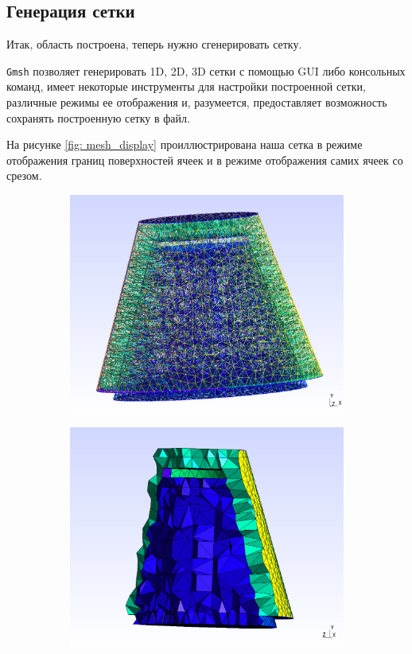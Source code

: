 \documentclass[a4paper, 14pt]{extreport}
\begin{document}
\newpage
\subsection{Генерация сетки}

Итак, область построена, теперь нужно сгенерировать сетку.

\texttt{Gmsh} позволяет генерировать 1D, 2D, 3D сетки с помощью 
GUI либо консольных команд, имеет некоторые инструменты
для настройки построенной сетки, различные режимы ее отображения
и, разумеется, предоставляет возможность сохранять построенную сетку в файл.

На рисунке \ref{fig: mesh_display}
проиллюстрирована наша сетка в режиме отображения границ
поверхностей ячеек и в режиме отображения самих ячеек со срезом.

\begin{figure}[H]
	\begin{subfigure}[h]{0.5\textwidth}
		\includegraphics[scale=0.23]{pictures/mesh_surfaces_edges_full.png}
	\end{subfigure}
	\begin{subfigure}[h]{0.5\textwidth}
		\includegraphics[scale=0.23]{pictures/mesh_volumes_slice.png}

\end{subfigure}
\end{figure}
\end{document}
